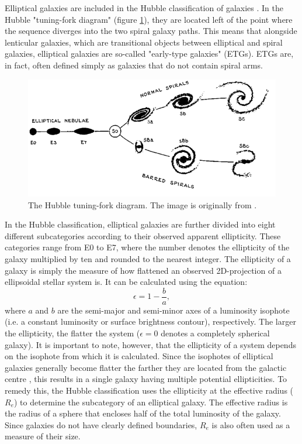 \documentclass[english, twoside]{HYgradu}
\begin{document}
Elliptical galaxies are included in the Hubble classification of galaxies \citep{Hubble1926}. In the Hubble "tuning-fork diagram" (figure \ref{figure:tuning_fork}), they are located left of the point where the sequence diverges into the two spiral galaxy paths. This means that alongside lenticular galaxies, which are transitional objects between elliptical and spiral galaxies, elliptical galaxies are so-called "early-type galaxies" (ETGs). ETGs are, in fact, often defined simply as galaxies that do not contain spiral arms.

\begin{figure}
	\centering
	\includegraphics[width=\textwidth]{TuningForkHubble.png}
	\caption{The Hubble tuning-fork diagram. The image is originally from \cite{Hubble1936}.}
	\label{figure:tuning_fork}
\end{figure}

In the Hubble classification, elliptical galaxies are further divided into eight different subcategories according to their observed apparent ellipticity. These categories range from E0 to E7, where the number denotes the ellipticity of the galaxy multiplied by ten and rounded to the nearest integer. The ellipticity of a galaxy is simply the measure of how flattened an observed 2D-projection of a ellipsoidal stellar system is. It can be calculated using the equation:
\begin{equation}
\epsilon = 1 - \frac{b}{a}, \label{eq:ellipticity}
\end{equation}
where $a$ and $b$ are the semi-major and semi-minor axes of a luminosity isophote (i.e. a constant luminosity or surface brightness contour), respectively. The larger the ellipticity, the flatter the system ($\epsilon = 0$ denotes a completely spherical galaxy). It is important to note, however, that the ellipticity of a system depends on the isophote from which it is calculated. Since the isophotes of elliptical galaxies generally become flatter the farther they are located from the galactic centre \citep{BinneyTremaine}, this results in a single galaxy having multiple potential ellipticities. To remedy this, the Hubble classification uses the ellipticity at the effective radius ($R_e$) to determine the subcategory of an elliptical galaxy. The effective radius is the radius of a sphere that encloses half of the total luminosity of the galaxy. Since galaxies do not have clearly defined boundaries, $R_e$ is also often used as a measure of their size. 
\end{document}
